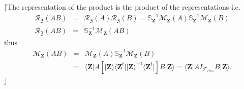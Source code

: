 \documentclass[aps, preprint]{revtex4}
\begin{document}
$\lceil $The representation of the product is the product of the representations i.e.
\begin{align}\mathcal{R}_{\mathfrak{Z}} \left (A B\right ) &  = & \mathcal{R}_{\mathfrak{Z}} \left (A\right ) \mathcal{R}_{\mathfrak{Z}} \left (B\right ) =\mathbb{S}_{\mathbf{Z}}^{ -1} \mathcal{M}_{\mathbf{Z}} \left (A\right ) \mathbb{S}_{\mathbf{Z}}^{ -1} \mathcal{M}_{\mathbf{Z}} \left (B\right ) \\
\mathcal{R}_{\mathfrak{Z}} \left (A B\right ) &  = & \mathbb{S}_{\mathbf{Z}}^{ -1} \mathcal{M}_{\mathbf{Z}} \left (A B\right )\end{align}thus
\begin{align}\mathcal{M}_{\mathbf{Z}} \left (A B\right ) &  = & \mathcal{M}_{\mathbf{Z}} \left (A\right ) \mathbb{S}_{\mathbf{Z}}^{ -1} \mathcal{M}_{\mathbf{Z}} \left (B\right ) \\
 &  = &  \langle \mathbf{Z}\vert A \left [\vert \mathbf{Z} \rangle  \langle \mathbf{Z}^{t}\vert \vert \mathbf{Z} \rangle ^{ -1} \langle \mathbf{Z}^{t}\vert \right ] B\vert \mathbf{Z} \rangle  = \langle \mathbf{Z}\vert A I_{\mathcal{F}_{H S 1}} B\vert \mathbf{Z} \rangle \text{.}\end{align}$\rfloor $ 
\end{document}

